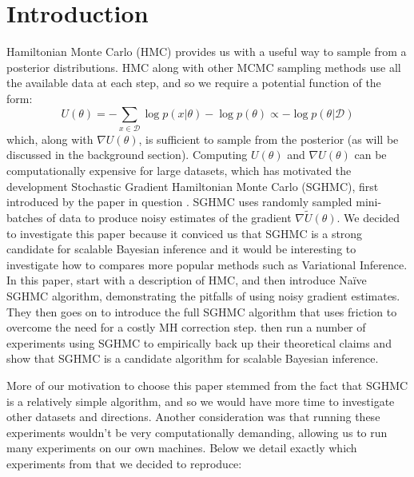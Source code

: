 
\section{Introduction}

Hamiltonian Monte Carlo (HMC) provides us with a useful way to sample from a posterior distributions. HMC along with other MCMC sampling methods use all the available data at each step, and so we require a potential function of the form:
\begin{equation*}
    U(\theta) = - \sum_{x\in\mathcal{D}}\log p(x| \theta) - \log p(\theta ) \propto -\log p(\theta | \mathcal{D})
\end{equation*}
which, along with $\nabla U(\theta)$, is sufficient to sample from the posterior (as will be discussed in the background section). Computing $U(\theta)$ and $\nabla U(\theta)$ can be computationally expensive for large datasets, which has motivated the development Stochastic Gradient Hamiltonian Monte Carlo (SGHMC), first introduced by the paper in question \cite{sghmc}. SGHMC uses randomly sampled mini-batches of data to produce noisy estimates of the gradient $\nabla \widetilde U(\theta)$. We decided to investigate this paper because it conviced us that SGHMC is a strong candidate for scalable Bayesian inference and it would be interesting to investigate how to compares more popular methods such as Variational Inference. In this paper, \citeauthor{sghmc} start with a description of HMC, and then introduce Naïve SGHMC algorithm, demonstrating the pitfalls of using noisy gradient estimates. They then goes on to introduce the full SGHMC algorithm
that uses friction to overcome the need for a costly MH correction step. \citeauthor{sghmc} then run a number of experiments using SGHMC to empirically back up their theoretical claims and show that SGHMC is a candidate algorithm for scalable Bayesian inference.

More of our motivation to choose this paper stemmed from the fact that SGHMC is a relatively simple algorithm, and so we would have more time to investigate other datasets and directions.  Another consideration was that running these experiments wouldn't be very computationally demanding, allowing us to run many experiments on our own machines. Below we detail exactly which experiments from \cite{sghmc} that we decided to reproduce:

